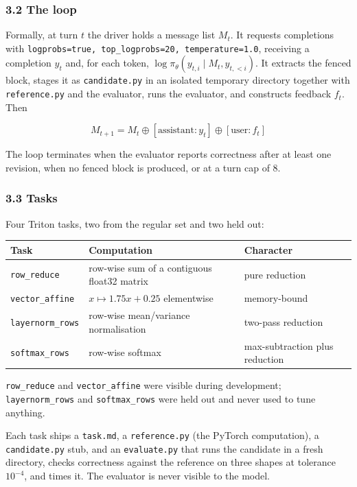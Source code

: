 \documentclass[
  11pt,
]{article}
\begin{document}
\hypertarget{the-loop}{%
\subsubsection{3.2 The loop}\label{the-loop}}

Formally, at turn \(t\) the driver holds a message list \(M_t\). It
requests completions with
\texttt{logprobs=true,\ top\_logprobs=20,\ temperature=1.0}, receiving a
completion \(y_t\) and, for each token,
\(\log \pi_\theta(y_{t,i} \mid M_t, y_{t,<i})\). It extracts the fenced
block, stages it as \texttt{candidate.py} in an isolated temporary
directory together with \texttt{reference.py} and the evaluator, runs
the evaluator, and constructs feedback \(f_t\). Then

\[M_{t+1} = M_t \oplus [\text{assistant}: y_t] \oplus [\text{user}: f_t]\]

The loop terminates when the evaluator reports correctness after at
least one revision, when no fenced block is produced, or at a turn cap
of 8.

\hypertarget{tasks}{%
\subsubsection{3.3 Tasks}\label{tasks}}

Four Triton tasks, two from the regular set and two held out:

\begin{longtable}[]{@{}lll@{}}
\toprule
Task & Computation & Character \\
\midrule
\endhead
\texttt{row\_reduce} & row-wise sum of a contiguous float32 matrix &
pure reduction \\
\texttt{vector\_affine} & \(x \mapsto 1.75x + 0.25\) elementwise &
memory-bound \\
\texttt{layernorm\_rows} & row-wise mean/variance normalisation &
two-pass reduction \\
\texttt{softmax\_rows} & row-wise softmax & max-subtraction plus
reduction \\
\bottomrule
\end{longtable}

\texttt{row\_reduce} and \texttt{vector\_affine} were visible during
development; \texttt{layernorm\_rows} and \texttt{softmax\_rows} were
held out and never used to tune anything.

Each task ships a \texttt{task.md}, a \texttt{reference.py} (the PyTorch
computation), a \texttt{candidate.py} stub, and an \texttt{evaluate.py}
that runs the candidate in a fresh directory, checks correctness against
the reference on three shapes at tolerance \(10^{-4}\), and times it.
The evaluator is never visible to the model.
\end{document}
